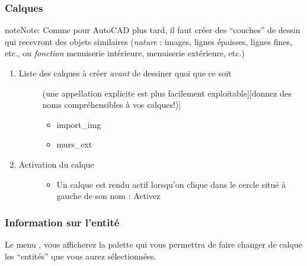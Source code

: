 \documentclass[a4paper,12pt,french]{sphinxmanual}
\begin{document}
\subsubsection{Calques}
\label{su/import-ssqu:calques}\label{su/import-ssqu:creation-calques-su-debut}
\begin{notice}{note}{Note:}
Comme pour AutoCAD plus tard, il faut créer des ``couches'' de dessin qui recevront des objets similaires (\emph{nature} : images, lignes épaisses, lignes fines, etc., ou \emph{fonction} menuiserie intérieure, menuiserie extérieure, etc.)
\end{notice}
\begin{enumerate}
\item {} \begin{description}
\item[{Liste des calques à créer \emph{avant} de dessiner quoi que ce soit}] \leavevmode{[}(une appellation explicite est plus facilement exploitable{]}{[}donnez des noms compréhensibles à vos calques!){]}\begin{itemize}
\item {} 
import\_img

\item {} 
murs\_ext

\end{itemize}

\end{description}

\item {} \begin{description}
\item[{Activation du calque}] \leavevmode\begin{itemize}
\item {} 
Un calque est rendu actif lorsqu'on clique dans le cercle situé à gauche de son nom : Activez 

\end{itemize}

\end{description}

\end{enumerate}


\subsubsection{Information sur l'entité}
\label{su/import-ssqu:information-sur-l-entite}
Le menu , vous afficherez la palette qui vous permettra de faire changer de calque les ``entités'' que vous aurez sélectionnées.
\end{document}
